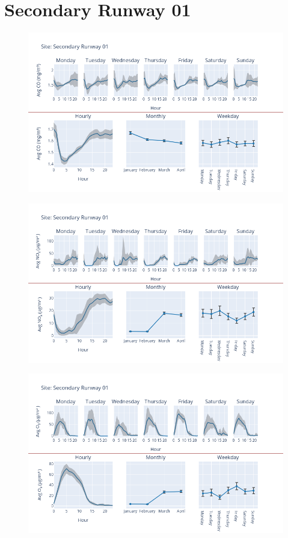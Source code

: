 \documentclass[12pt, oneside]{book}
\begin{document}
{\section{ Secondary Runway 01}
{\begin{figure}[H] 
 \centering 
\includegraphics[width=.88\textwidth, keepaspectratio]{image158} 
 \end{figure}}{} 

{\begin{figure}[H] 
 \centering 
\includegraphics[width=.88\textwidth, keepaspectratio]{image159} 
 \end{figure}}{} 

{\begin{figure}[H] 
 \centering 
\includegraphics[width=.88\textwidth, keepaspectratio]{image160} 
 \end{figure}}{} 

}
\end{document}
